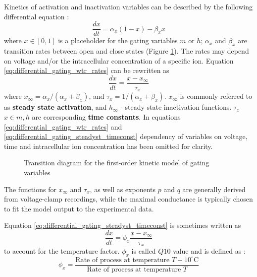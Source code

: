 \documentclass[../main.tex]{subfiles}
\begin{document}
Kinetics of activation and inactivation variables can be described by the following differential equation \parencite{wangModelTtypeCalcium1991}:
\begin{equation} \label{eq:differential_gating_wtr_rates}
    \frac{dx}{dt} = \alpha_x (1 - x) - \beta_x x
\end{equation}
where $x \in [0, 1]$ is a placeholder for the gating variables $m$ or $h$; $\alpha_x$ and $\beta_x$ are transition rates between open and close states (Figure \ref{fig:gating_first_order_kinetics}). The rates may depend on voltage and/or the intracellular concentration of a specific ion. Equation \ref{eq:differential_gating_wtr_rates} can be rewritten as
\begin{equation} \label{eq:differential_gating_steadyst_timeconst}
    \frac{dx}{dt} = \frac{x - x_{\infty}}{\tau_x}
\end{equation}
where $x_{\infty}=\alpha_x/(\alpha_x + \beta_x)$, and $\tau_{x}=1/(\alpha_x + \beta_x)$.
$x_\infty$ is commonly referred to as \textbf{steady state activation}, and $h_\infty$ - steady state inactivation functions. $\tau_{x}$ $x\in{m,h}$ are corresponding \textbf{time constants}.
In equations \ref{eq:differential_gating_wtr_rates} and \ref{eq:differential_gating_steadyst_timeconst} dependency of variables on voltage, time and intracellular ion concentration has been omitted for clarity.

\begin{figure}[!t]
    \centering
    \caption{Transition diagram for the first-order kinetic model of gating variables}
    \label{fig:gating_first_order_kinetics}
\end{figure}

The functions for $x_\infty$ and $\tau_x$, as well as exponents $p$ and $q$ are generally derived from voltage-clamp recordings, while the maximal conductance is typically chosen to fit the model output to the experimental data.

Equation \ref{eq:differential_gating_steadyst_timeconst} is sometimes written as
\begin{equation}\label{eq:differential_gating_steadyst_timeconst_q10}
    \frac{dx}{dt} = \phi_x\frac{x - x_{\infty}}{\tau_x}
\end{equation}
to account for the temperature factor. $\phi_x$ is called $Q10$ value and is defined as \parencite{sterrattQ10EffectTemperature2015}:
\begin{equation}
    \phi_x=\frac{\text{Rate of process at temperature $T+10^\circ$C}}{\text{Rate of process at temperature $T$}}
\end{equation}
\end{document}
